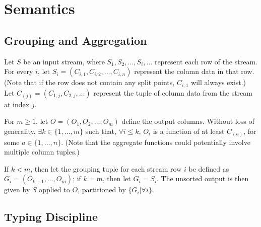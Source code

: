 % 
% 
% 
% 
% 

\section{Semantics}

\subsection{Grouping and Aggregation}


Let $S$ be an input stream, where $S_1, S_2, \ldots, S_i, \ldots$
represent each row of the stream. For every $i$, let $S_i=(C_{i,1},
C_{i,2}, \ldots, C_{i,n})$ represent the column data in that row. (Note
that if the row does not contain any split points, $C_{i,1}$ will always
exist.) Let $C_{(j)}=(C_{1,j}, C_{2,j}, \ldots)$ represent the tuple of
column data from the stream at index $j$.

For $m\geq 1$, let $O=(O_1, O_2, \ldots, O_m)$ define the output
columns. Without loss of generality, $\exists k\in\{1, \ldots, m\}$
such that, $\forall i\leq k$, $O_i$ is a function of at least $C_{(a)}$,
for some $a\in\{1, \ldots, n\}$. (Note that the aggregate functions
could potentially involve multiple column tuples.)

If $k<m$, then let the grouping tuple for each stream row $i$ be defined
as $G_i=(O_{k+1}, \ldots, O_m)$; if $k=m$, then let $G_i=S_i$. The
unsorted output is then given by $S$ applied to $O$, partitioned by
$\{G_i | \forall i\}$.

\subsection{Typing Discipline}

